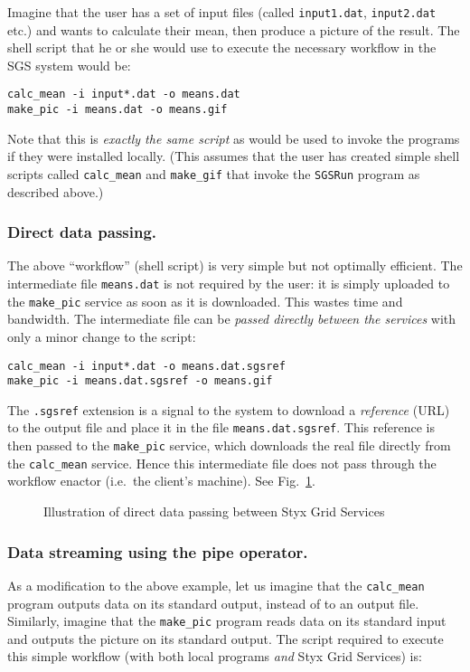 \documentclass{llncs}
\begin{document}
Imagine that the user has a set of input files (called {\tt input1.dat}, {\tt input2.dat} etc.) and wants to calculate their mean, then produce a picture of the result.  The shell script that he or she would use to execute the necessary workflow in the SGS system would be:

\begin{verbatim}
calc_mean -i input*.dat -o means.dat
make_pic -i means.dat -o means.gif
\end{verbatim}

Note that this is {\em exactly the same script\/} as would be used to invoke the programs if they were installed locally.  (This assumes that the user has created simple shell scripts called {\tt calc\_mean} and {\tt make\_gif} that invoke the {\tt SGSRun} program as described above.)

\subsubsection{Direct data passing.}
The above ``workflow'' (shell script) is very simple but not optimally efficient.  The intermediate file {\tt means.dat} is not required by the user: it is simply uploaded to the {\tt make\_pic} service as soon as it is downloaded.  This wastes time and bandwidth.  The intermediate file can be {\em passed directly between the services\/} with only a minor change to the script:

\begin{verbatim}
calc_mean -i input*.dat -o means.dat.sgsref
make_pic -i means.dat.sgsref -o means.gif
\end{verbatim}

The {\tt .sgsref} extension is a signal to the system to download a {\em reference\/} (URL) to the output file and place it in the file {\tt means.dat.sgsref}.  This reference is then passed to the {\tt make\_pic} service, which downloads the real file directly from the {\tt calc\_mean} service.  Hence this intermediate file does not pass through the workflow enactor (i.e.\ the client's machine).  See Fig.~\ref{fig:datapassing}.

\begin{figure}
\caption{Illustration of direct data passing between Styx Grid Services}\label{fig:datapassing}
\end{figure}

\subsubsection{Data streaming using the pipe operator.}\label{sec:pipes}
As a modification to the above example, let us imagine that the {\tt calc\_mean} program outputs data on its standard output, instead of to an output file.  Similarly, imagine that the {\tt make\_pic} program reads data on its standard input and outputs the picture on its standard output.  The script required to execute this simple workflow (with both local programs {\em and\/} Styx Grid Services) is:
\end{document}
